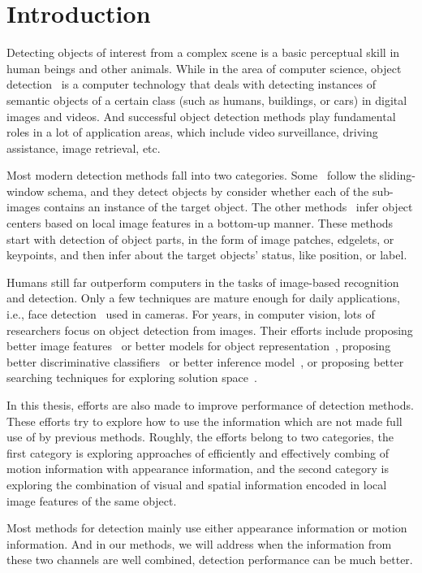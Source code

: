 \chapter{Introduction}
Detecting objects of interest from a complex scene is a basic perceptual skill in human beings and other animals.
While in the area of computer science, object detection~\citep{dod} is a computer technology that deals with detecting instances of semantic objects of a certain class (such as humans, buildings, or cars) in digital images and videos. And successful object detection
methods play fundamental roles in a lot of application areas, which include video surveillance, driving assistance, image retrieval, etc.

Most modern detection methods fall into two categories. Some~\citep{ij4,ac31,ac30,ac4,ac32,ac29,ac28,ac1} follow the sliding-window schema, and they detect objects by consider whether each of the sub-images contains an instance of the target object. The other methods~\citep{ac9,ac2,ac3,ac22,lb1,ac5,ac10,ac21,ac18} infer object centers based on local image features in a bottom-up manner. These methods start with detection of object parts, in the form of image patches, edgelets, or keypoints, and then infer about the target objects' status, like position, or label.


 Humans still far outperform computers in the tasks of image-based recognition and detection. Only a few techniques are mature enough for daily applications, i.e., face detection~\citep{face} used in cameras. For years, in computer vision, lots of researchers focus on object detection from images. Their efforts include proposing better image features~\citep{o17} or better models for object representation~\citep{bgf}, proposing better discriminative classifiers~\citep{dlearn} or better inference model~\citep{hdp}, or proposing better searching techniques for exploring solution space~\citep{bab}.

 In this thesis, efforts are also made to improve performance of detection methods. These efforts try to explore how to use the information which are not made full use of by previous methods. Roughly, the efforts belong to two categories, the first category is exploring approaches of efficiently and effectively combing of motion information with appearance information, and the second category is exploring the combination of visual and spatial information encoded in local image features of the same object.

 Most methods for detection mainly use either appearance information or motion information. And in our methods, we will address when the information from these two channels are well combined, detection performance can be much better.

